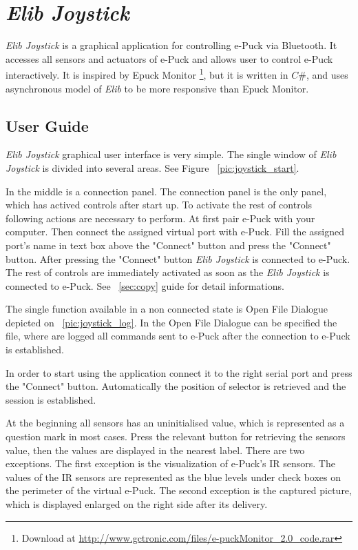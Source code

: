 \documentclass[12pt,notitlepage]{report}
\begin{document}
\chapter{{\it Elib Joystick}} \label{app:joystick}
	{\it Elib Joystick} is a graphical application for controlling e-Puck via Bluetooth.
	It accesses all sensors and actuators of e-Puck and allows user to control e-Puck interactively.
	It is inspired by Epuck Monitor 
	\footnote{\small{Download at \url{http://www.gctronic.com/files/e-puckMonitor_2.0_code.rar}}},
	but it is written in $C\#$, and uses asynchronous model
	of {\it Elib} to be more responsive than Epuck Monitor.

	\section{User Guide} \label{sec:joyguide}
	{\it Elib Joystick} graphical user interface is very simple. The single window of {\it Elib Joystick} 
	is divided into several areas.
	See Figure ~\ref{pic:joystick_start}.
	

	In the middle is a connection panel. The connection panel is the only panel, which 
	has actived controls after start up. To activate the rest of controls following actions are necessary to
	perform. At first pair e-Puck with your computer. Then connect the assigned virtual port with e-Puck.
	Fill the assigned port's name in text box above the "Connect" button and press
	the "Connect" button. After pressing the "Connect" button {\it Elib Joystick} is connected to e-Puck. 
	The rest of controls are immediately activated
	as soon as the {\it Elib Joystick} is connected to e-Puck.
	See ~\ref{sec:copy} guide for detail informations. 
	
	
	The single function available in a non connected state
	is Open File Dialogue depicted on ~\ref{pic:joystick_log}.
	In the  Open File Dialogue can be specified the file, 
	where are logged all commands sent to e-Puck after the connection
	to e-Puck is established.

	In order to start using the application connect it to the right serial port and press the "Connect" button.
	Automatically the position of selector is retrieved and the session is established.

	At the beginning all sensors has an uninitialised value, which is represented as a question mark 
	in most cases.
	Press the relevant button for retrieving the sensors value, then the values are displayed in the nearest label.
	There are two exceptions. The first exception is the visualization of e-Puck's IR sensors. 
	The values of the IR sensors
	are represented as the blue levels under check boxes on 
	the perimeter of the virtual e-Puck.
	The second  exception is the captured picture, which is displayed enlarged on the right side after its delivery.
\end{document}
